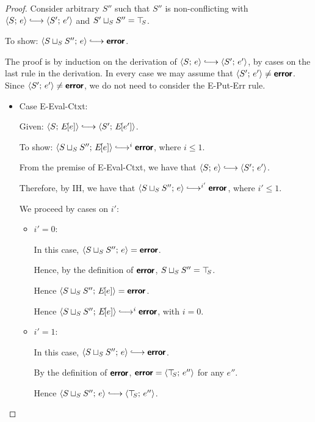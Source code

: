 \begin{proof}
  Consider arbitrary $S''$ such that $S''$ is non-conflicting with
  $\config{S}{e} \parstepsto \config{S'}{e'}$ and $S' \sqcup_{S} S''
  = \top\hspace{-0.85mm}_{S}$.

  To show: $\config{\lubstore{S}{S''}}{e} \parstepsto \error$.

  The proof is by induction on the derivation of $\config{S}{e}
  \parstepsto \config{S'}{e'}$, by cases on the last rule in the
  derivation.  In every case we may assume that $\langle S';\, e' \rangle \neq
  \textbf{\textsf{error}}$.  Since $\langle S';\, e' \rangle \neq \textbf{\textsf{error}}$, we do not need to
  consider the {\sc E-Put-Err} rule.

  \begin{itemize}

    \item Case {\sc E-Eval-Ctxt}:

      Given: $\config{S}{\E{e}} \parstepsto \config{S'}{\E{e'}}$.

      To show: $\config{\lubstore{S}{S''}}{\E{e}} \parstepsto^i
      \error$, where $i \leq 1$.

      From the premise of {\sc E-Eval-Ctxt}, we have that
      $\config{S}{e} \parstepsto \config{S'}{e'}$.

      Therefore, by IH, we have that $\config{\lubstore{S}{S''}}{e}
      \parstepsto^{i'} \error$, where $i' \leq 1$.

      We proceed by cases on $i'$:

      \begin{itemize}
        \item $i' = 0$:

          In this case, $\langle S \sqcup_{S} S'';\, e \rangle = \textbf{\textsf{error}}$.

          Hence, by the definition of $\textbf{\textsf{error}}$, $S \sqcup_{S} S'' =
          \top\hspace{-0.85mm}_{S}$.

          Hence $\langle S \sqcup_{S} S'';\, E\hspace{-1mm}\left[e\right] \rangle = \textbf{\textsf{error}}$.

          Hence $\config{\lubstore{S}{S''}}{\E{e}} \parstepsto^i
          \error$, with $i = 0$.

        \item $i' = 1$:

          In this case, $\config{\lubstore{S}{S''}}{e} \parstepsto
          \error$.

          By the definition of $\textbf{\textsf{error}}$, $\textbf{\textsf{error}} =
          \langle \top\hspace{-0.85mm}_{S};\, e'' \rangle$ for any $e''$.

          Hence $\config{\lubstore{S}{S''}}{e} \parstepsto
          \config{\topS}{e''}$.


\end{itemize}
\end{itemize}
\end{proof}
